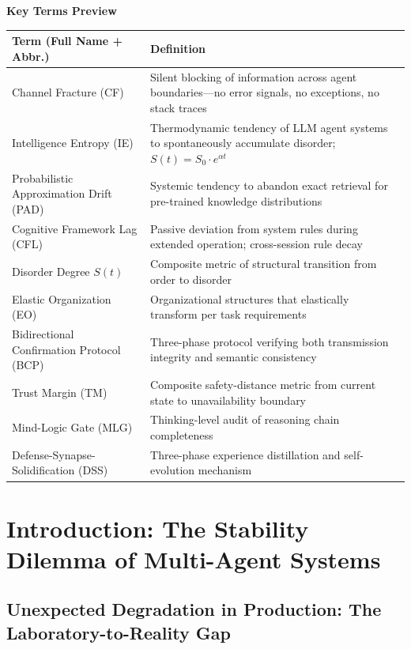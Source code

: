 \documentclass[11pt,a4paper]{article}
\begin{document}
\noindent\textbf{Key Terms Preview}

\begin{table}[H]
\centering
\small
\begin{tabular}{p{}p{}}
\toprule
\textbf{Term (Full Name + Abbr.)} & \textbf{Definition} \\
\midrule
Channel Fracture (CF) & Silent blocking of information across agent boundaries---no error signals, no exceptions, no stack traces \\
Intelligence Entropy (IE) & Thermodynamic tendency of LLM agent systems to spontaneously accumulate disorder; $S(t)=S_0\cdot e^{\alpha t}$ \\
Probabilistic Approximation Drift (PAD) & Systemic tendency to abandon exact retrieval for pre-trained knowledge distributions \\
Cognitive Framework Lag (CFL) & Passive deviation from system rules during extended operation; cross-session rule decay \\
Disorder Degree $S(t)$ & Composite metric of structural transition from order to disorder \\
Elastic Organization (EO) & Organizational structures that elastically transform per task requirements \\
Bidirectional Confirmation Protocol (BCP) & Three-phase protocol verifying both transmission integrity and semantic consistency \\
Trust Margin (TM) & Composite safety-distance metric from current state to unavailability boundary \\
Mind-Logic Gate (MLG) & Thinking-level audit of reasoning chain completeness \\
Defense-Synapse-Solidification (DSS) & Three-phase experience distillation and self-evolution mechanism \\
\bottomrule
\end{tabular}
\end{table}

\section{Introduction: The Stability Dilemma of Multi-Agent Systems}
\label{sec:intro}

\subsection{Unexpected Degradation in Production: The Laboratory-to-Reality Gap}
\label{sec:gap}
\end{document}

